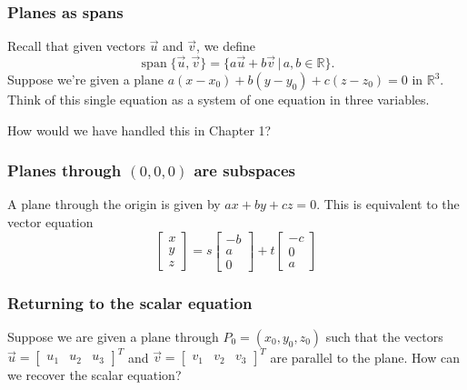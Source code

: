 \documentclass[11pt,t]{beamer}
\DeclareMathOperator{\spn}{span}
\newcommand{\R}{\mathbb{R}}
\begin{document}
\begin{frame}\frametitle{Planes as spans}
 Recall that given vectors $\vec{u}$ and $\vec{v}$, we define
\[
 \spn\{\vec{u},\vec{v}\} = \{a\vec{u}+b\vec{v} \,|\,a,b\in\R\}.
\]
Suppose we're given a plane $a(x-x_0)+b(y-y_0)+c(z-z_0)=0$ in $\R^3$. Think of this single equation as a \alert{system} of one equation in three variables. 

How would we have handled this in Chapter 1?
\end{frame}
\begin{frame}\frametitle{Planes through $(0,0,0)$ are subspaces}
 A plane through the origin is given by $ax+by+cz=0$. This is equivalent to the vector equation
\[
 \begin{bmatrix}x\\y\\z\end{bmatrix} = s\begin{bmatrix}-b\\a\\0\end{bmatrix}+t\begin{bmatrix}-c\\0\\a\end{bmatrix}
\]

\end{frame}
\begin{frame}\frametitle{Returning to the scalar equation}
Suppose we are given a plane through $P_0=(x_0,y_0,z_0)$ such that the vectors $\vec{u}=\begin{bmatrix}u_1&u_2&u_3\end{bmatrix}^T$ and $\vec{v}=\begin{bmatrix}v_1&v_2&v_3\end{bmatrix}^T$ are parallel to the plane. How can we recover the scalar equation?
 
\end{frame}
\end{document}
